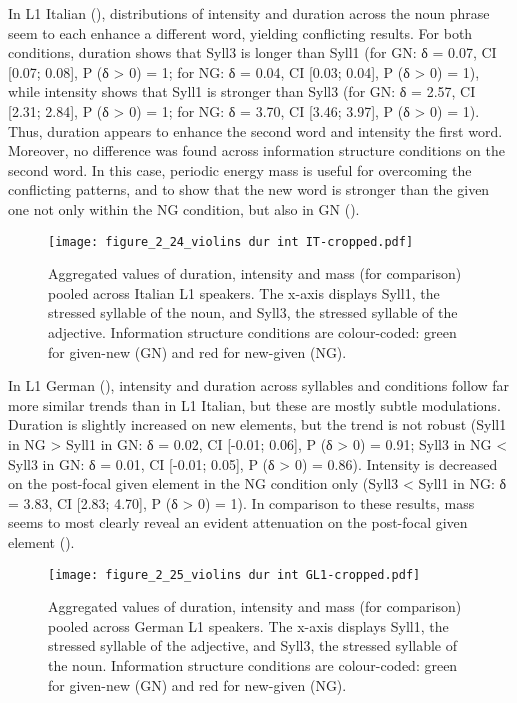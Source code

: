 In L1 Italian (), distributions of intensity and duration across the noun phrase seem to each enhance a different word, yielding conflicting results. For both conditions, duration shows that Syll3 is longer than Syll1 (for GN: δ = 0.07, CI [0.07; 0.08], P (δ > 0) = 1; for NG: δ = 0.04, CI [0.03; 0.04], P (δ > 0) = 1), while intensity shows that Syll1 is stronger than Syll3 (for GN: δ = 2.57, CI [2.31; 2.84], P (δ > 0) = 1; for NG: δ = 3.70, CI [3.46; 3.97], P (δ > 0) = 1). Thus, duration appears to enhance the second word and intensity the first word. Moreover, no difference was found across information structure conditions on the second word. In this case, periodic energy mass is useful for overcoming the conflicting patterns, and to show that the new word is stronger than the given one not only within the NG condition, but also in GN ().

\begin{figure}%
\texttt{[image: figure\_2\_24\_violins dur int IT-cropped.pdf]}
\caption{Aggregated values of duration, intensity and mass (for comparison) pooled across Italian L1 speakers. The x-axis displays Syll1, the stressed syllable of the noun, and Syll3, the stressed syllable of the adjective. Information structure conditions are colour-coded: green for given-new (GN) and red for new-given (NG).}
\label{fig:2.24}
\end{figure}

In L1 German (), intensity and duration across syllables and conditions follow far more similar trends than in L1 Italian, but these are mostly subtle modulations. Duration is slightly increased on new elements, but the trend is not robust (Syll1 in NG > Syll1 in GN: δ = 0.02, CI [-0.01; 0.06], P (δ > 0) = 0.91; Syll3 in NG < Syll3 in GN: δ = 0.01, CI [-0.01; 0.05], P (δ > 0) = 0.86). Intensity is decreased on the post-focal given element in the NG condition only (Syll3 < Syll1 in NG: δ = 3.83, CI [2.83; 4.70], P (δ > 0) = 1). In comparison to these results, mass seems to most clearly reveal an evident attenuation on the post-focal given element ().

\begin{figure}
\texttt{[image: figure\_2\_25\_violins dur int GL1-cropped.pdf]}
\caption{Aggregated values of duration, intensity and mass (for comparison) pooled across German L1 speakers. The x-axis displays Syll1, the stressed syllable of the adjective, and Syll3, the stressed syllable of the noun. Information structure conditions are colour-coded: green for given-new (GN) and red for new-given (NG).}
\label{fig:2.25}
\end{figure}

